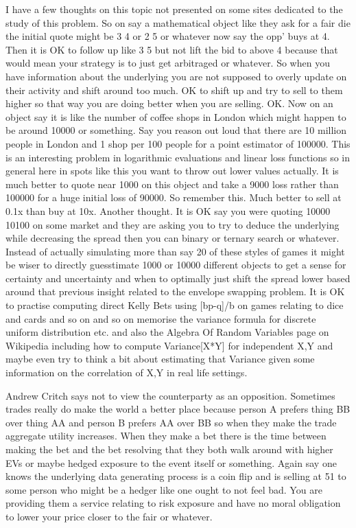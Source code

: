 I have a few thoughts on this topic not presented on some sites dedicated to the study of this problem. So on say a mathematical object like they ask for a fair die the initial quote might be 3 4 or 2 5 or whatever now say the opp' buys at 4. Then it is OK to follow up like 3 5 but not lift the bid to above 4 because that would mean your strategy is to just get arbitraged or whatever. So when you have information about the underlying you are not supposed to overly update on their activity and shift around too much. OK to shift up and try to sell to them higher so that way you are doing better when you are selling. OK. Now on an object say it is like the number of coffee shops in London which might happen to be around 10000 or something. Say you reason out loud that there are 10 million people in London and 1 shop per 100 people for a point estimator of 100000. This is an interesting problem in logarithmic evaluations and linear loss functions so in general here in spots like this you want to throw out lower values actually. It is much better to quote near 1000 on this object and take a 9000 loss rather than 100000 for a huge initial loss of 90000. So remember this. Much better to sell at 0.1x than buy at 10x. Another thought. It is OK say you were quoting 10000 10100 on some market and they are asking you to try to deduce the underlying while decreasing the spread then you can binary or ternary search or whatever. Instead of actually simulating more than say 20 of these styles of games it might be wiser to directly guesstimate 1000 or 10000 different objects to get a sense for certainty and uncertainty and when to optimally just shift the spread lower based around that previous insight related to the envelope swapping problem. It is OK to practise computing direct Kelly Bets using [bp-q]/b on games relating to dice and cards and so on and so on memorise the variance formula for discrete uniform distribution etc. and also the Algebra Of Random Variables page on Wikipedia including how to compute Variance[X*Y] for independent X,Y and maybe even try to think a bit about estimating that Variance given some information on the correlation of X,Y in real life settings.

Andrew Critch says not to view the counterparty as an opposition. Sometimes trades really do make the world a better place because person A prefers thing BB over thing AA and person B prefers AA over BB so when they make the trade aggregate utility increases. When they make a bet there is the time between making the bet and the bet resolving that they both walk around with higher EVs or maybe hedged exposure to the event itself or something. Again say one knows the underlying data generating process is a coin flip and is selling at 51 to some person who might be a hedger like one ought to not feel bad. You are providing them a service relating to risk exposure and have no moral obligation to lower your price closer to the fair or whatever.

